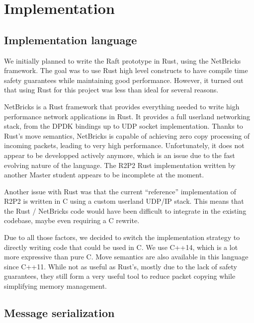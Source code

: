 \chapter{Implementation}
\label{chap:implementation}

\section{Implementation language}

We initially planned to write the Raft prototype in Rust, using the NetBricks\cite{netbricks} framework.
The goal was to use Rust high level constructs to have compile time safety guarantees while maintaining good performance.
However, it turned out that using Rust for this project was less than ideal for several reasons.

NetBricks\cite{netbricks} is a Rust framework that provides everything needed to write high performance network applications in Rust.  %
It provides a full userland networking stack, from the DPDK bindings up to UDP socket implementation.
Thanks to Rust's move semantics, NetBricks is capable of achieving zero copy processing of incoming packets, leading to very high performance.
Unfortunately, it does not appear to be developped actively anymore, which is an issue due to the fast evolving nature of the language.
The R2P2 Rust implementation\cite{ogier} written by another Master student appears to be incomplete at the moment.

Another issue with Rust was that the current ``reference'' implementation of R2P2 is written in C using a custom userland UDP/IP stack.
This means that the Rust / NetBricks code would have been difficult to integrate in the existing codebase, maybe even requiring a C rewrite.

Due to all those factors, we decided to switch the implementation strategy to directly writing code that could be used in C.
We use C++14, which is a lot more expressive than pure C.
Move semantics are also available in this language since C++11.
While not as useful as Rust's, mostly due to the lack of safety guarantees, they still form a very useful tool to reduce packet copying while simplifying memory management.


\section{Message serialization}

